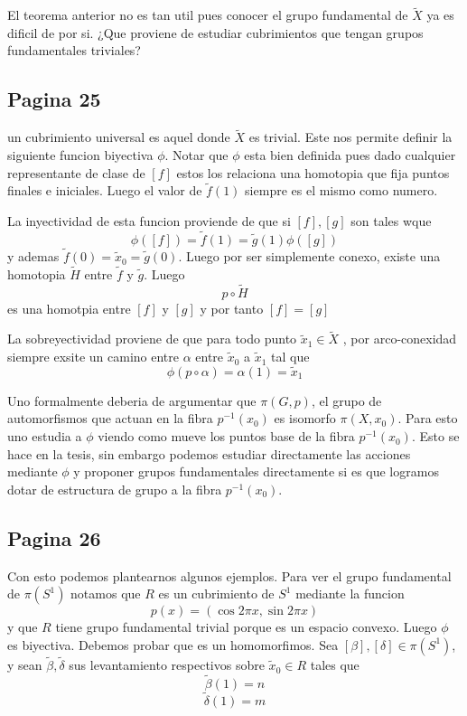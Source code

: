 \documentclass[letterpaper]{article}
\begin{document}
El teorema anterior no es tan util pues conocer el grupo fundamental de
\(\tilde X\) ya es dificil de por si. ¿Que proviene de estudiar
cubrimientos que tengan grupos fundamentales triviales?

\subsection*{Pagina 25}
un cubrimiento universal es aquel donde \(\tilde X\) es trivial. Este
nos permite definir la siguiente funcion biyectiva \(\phi\). Notar que
\(\phi\) esta bien definida pues dado cualquier representante de clase
de \([f]\) estos los relaciona una homotopia que fija puntos finales e
iniciales. Luego el valor de \(\tilde f (1)\) siempre es el mismo como
numero.

La inyectividad de esta funcion proviende de que si \([f] , [g]\) son
tales wque
\[ \phi ([f]) = \tilde f (1) = \tilde g (1) \phi ([g]) \]
y ademas \(\tilde f (0) = \tilde x_0 = \tilde g (0)\). Luego por ser
simplemente conexo, existe una homotopia \(\tilde H\) entre \(\tilde f\)
y \(\tilde g\). Luego
\[ p \circ \tilde H \]
es una homotpia entre \([f]\) y \([g]\) y por tanto \([f] = [g] \)

La sobreyectividad proviene de que para todo punto \(\tilde x_1 \in
\tilde X\) , por arco-conexidad siempre exsite un camino entre
\(\alpha\) entre \(\tilde x_0\) a \(\tilde x_1\) tal que
\[ \phi (p \circ \alpha) = \alpha (1) = \tilde x_1\]

Uno formalmente deberia de argumentar que \(\pi (G,p)\), el grupo de
automorfismos que actuan en la fibra \(p^{-1} (x_0)\) es isomorfo \(\pi
(X, x_0)\). Para esto uno estudia a \(\phi\) viendo como mueve los
puntos base de la fibra \(p^{-1} (x_0)\). Esto se hace en la tesis, sin
embargo podemos estudiar directamente las acciones mediante \(\phi\) y
proponer grupos fundamentales directamente si es que logramos dotar de
estructura de grupo a la fibra \(p^{-1} (x_0)\).

\subsection*{Pagina 26}
Con esto podemos plantearnos algunos ejemplos. Para ver el grupo
fundamental de \(\pi(S^1)\) notamos que \(R\) es un cubrimiento de \(S^1
\) mediante la funcion
\[ p (x) = (\cos 2 \pi x, \sin 2 \pi x) \]
y que \(R\) tiene grupo fundamental trivial porque es un espacio
convexo. Luego \(\phi\) es biyectiva. Debemos probar que es un
homomorfimos.
Sea \([\beta],[\delta] \in \pi (S^1)\), y sean \(\tilde
\beta , \tilde \delta\) sus levantamiento respectivos sobre \(\tilde x_0
\in R\) tales que
\[ \tilde \beta (1) = n \]
\[ \tilde \delta (1) = m \]
\end{document}
